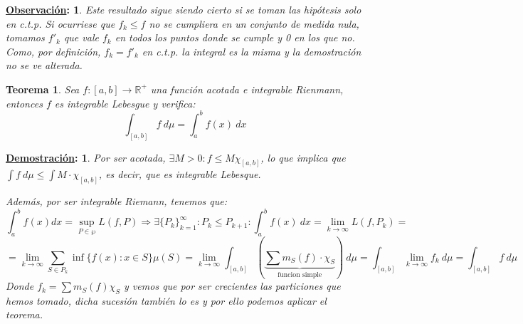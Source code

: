 \documentclass[10pt,a4paper,openright]{book}
\theoremstyle{break}
\newtheorem*{theo}{Teorema}
\newtheorem*{demo}{\underline{Demostración}:}
\newtheorem*{obs}{\underline{Observación}:}
\begin{document}
\begin{obs}
Este resultado sigue siendo cierto si se toman las hipótesis solo en c.t.p. Si ocurriese que $f_k \leq f$ no se cumpliera en un conjunto de medida nula, tomamos $f'_k$ que vale $f_k$ en todos los puntos donde se cumple y 0 en los que no. Como, por definición, $f_k = f'_k$ en c.t.p. la integral es la misma y la demostración no se ve alterada.
\end{obs}

\begin{theo}
Sea $f: \left[a, b\right] \rightarrow \mathbb{R}^+$ una función acotada e integrable Rienmann, entonces $f$ es integrable Lebesgue y verifica:
$$\int_{\left[a, b\right]}f \ d \mu = \int_a^b f\left(x\right)\ dx$$
\end{theo}
\begin{demo}
Por ser acotada, $\exists M > 0: f \le M\chi_{\left[a, b\right]}$, lo que implica que $\int f \ d \mu \leq \int M \cdot \chi_{[a,b]}$, es decir, que es integrable Lebesque.

Además, por ser integrable Riemann, tenemos que:
$$\int_a^b f\left(x\right)dx = \sup_{P \in \wp} L\left(f, P\right) \Rightarrow \exists \{P_k\}_{k=1}^{\infty} : P_k \leq P_{k+1} : \int_a^b f\left(x\right) \ dx = \lim_{k\rightarrow \infty} L\left(f, P_k\right) = $$
$$= \lim_{k\rightarrow\infty} \sum_{S \in P_k} \inf \{f\left(x\right) : x \in S\}\mu\left(S\right) = \lim_{k\rightarrow\infty} \int_{\left[a, b\right]}\left(\underbrace{\sum m_S \left(f\right) \cdot \chi_S}_{\text{funcion simple}}\right) \ d \mu = \int_{\left[a, b\right]}\lim_{k\rightarrow\infty} f_k \ d \mu = \int_{\left[a, b\right]}f \ d \mu$$
Donde $f_k = \sum m_S\left(f\right) \chi_S$ y vemos que por ser crecientes las particiones que hemos tomado, dicha sucesión también lo es y por ello podemos aplicar el teorema.
\end{demo}
\end{document}
